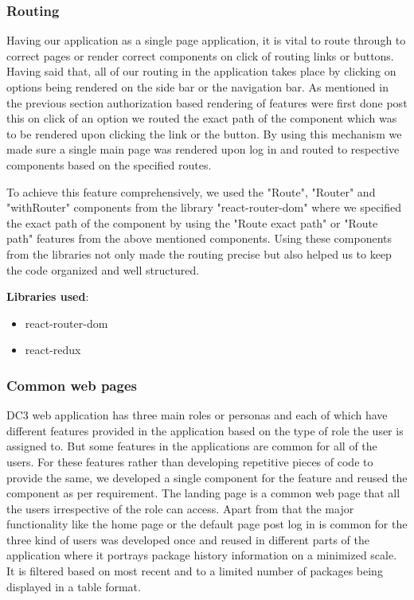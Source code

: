\subsubsection{Routing}

Having our application as a single page application, it is vital to route through to correct pages or render correct components on click of routing links or buttons.
Having said that, all of our routing in the application takes place by clicking on options being rendered on the side bar or the navigation bar. As mentioned in the previous section authorization based rendering of features were first done post this on click of an option we routed the exact path of the component which was to be rendered upon clicking the link or the button. By using this mechanism we made sure a single main page was rendered upon log in and routed to respective components based on the specified routes.

To achieve this feature comprehensively, we used the "Route", "Router" and "withRouter" components from the library "react-router-dom" where we specified the exact path of the component by using the "Route exact path" or "Route path" features from the above mentioned components. Using these components from the libraries not only made the routing precise but also helped us to keep the code organized and well structured.

\textbf{Libraries used}:
\begin{itemize}
    \item react-router-dom
    \item react-redux
\end{itemize}

\subsubsection{Common web pages}
DC3 web application has three main roles or personas and each of which have different features provided in the application based on the type of role the user is assigned to. But some features in the applications are common for all of the users. For these features rather than developing repetitive pieces of code to provide the same, we developed a single component for the feature and reused the component as per requirement. 
The landing page is a common web page that all the users irrespective of the role can access. Apart from that the major functionality like the home page or the default page post log in is  common for the three kind of users was developed once and reused in different parts of the application where it portrays package history information on a minimized scale. It is filtered based on most recent and to a limited number of packages being displayed in a table format.

